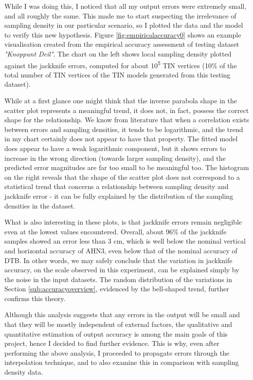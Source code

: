 While I was doing this, I noticed that all my output errors were extremely small, and all roughly the same. This made me to start suspecting the irrelevance of sampling density in our particular scenario, so I plotted the data and the model to verify this new hypothesis. Figure \ref{fig:empiricalaccuracy0} shows an example visualisation created from the empirical accuracy assessment of testing dataset \textit{"Knoppunt Deil"}. The chart on the left shows local sampling density plotted against the jackknife errors, computed for about 10\textsuperscript{5} TIN vertices (10\% of the total number of TIN vertices of the TIN models generated from this testing dataset).

While at a first glance one might think that the inverse parabola shape in the scatter plot represents a meaningful trend, it does not, in fact, possess the correct shape for the relationship. We know from literature that when a correlation exists between errors and sampling densities, it tends to be logarithmic, and the trend in my chart certainly does not appear to have that property. The fitted model does appear to have a weak logarithmic component, but it shows errors to increase in the wrong direction (towards larger sampling density), and the predicted error magnitudes are far too small to be meaningful too. The histogram on the right reveals that the shape of the scatter plot does not correspond to a statistical trend that concerns a relationship between sampling density and jackknife error - it can be fully explained by the distribution of the sampling densities in the dataset.

What is also interesting in these plots, is that jackknife errors remain negligible even at the lowest values encountered. Overall, about 96\% of the jackknife samples showed an error less than 3 cm, which is well below the nominal vertical and horizontal accuracy of AHN3, even below that of the nominal accuracy of DTB. In other words, we may safely conclude that the variation in jackknife accuracy, on the scale observed in this experiment, can be explained simply by the noise in the input datasets. The random distribution of the variations in Section \ref{sub:accuracyoverview}, evidenced by the bell-shaped trend, further confirms this theory.

Although this analysis suggests that any errors in the output will be small and that they will be mostly independent of external factors, the qualitative and quantitative estimation of output accuracy is among the main goals of this project, hence I decided to find further evidence. This is why, even after performing the above analysis, I proceeded to propagate errors through the interpolation technique, and to also examine this in comparison with sampling density data.

